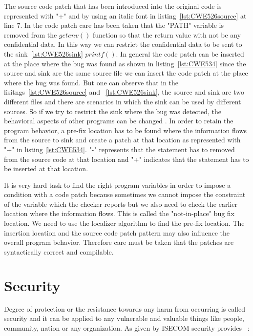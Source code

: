 The source code patch that has been introduced into the original code is represented with "+" and by using an italic font
in listing~\ref{lst:CWE526source} at line 7. In the code patch care has been taken that the "PATH" variable is removed from the $getenv()$
function so that the return value with not be any confidential data. In this way we can restrict the confidential data
to be sent to the sink~\ref{lst:CWE526sink} $printf()$. In general the code patch can be inserted at the place where the bug was found 
as shown in listing~\ref{lst:CWE534} since the source and sink are the same source file we can insert the code patch at the place 
where the bug was found. But one can observe that in the lisitngs~\ref{lst:CWE526source} and ~\ref{lst:CWE526sink}, the source
and sink are two different files and there are scenarios in which the sink can
be used by different sources. So if we 
try to restrict the sink where the bug was detected, 
the behavioral aspects of other programs can be changed 
. In order to retain the program behavior, a pre-fix location has to be 
found where the information flows from the source to sink and create
a patch at that location as represented with "+" in listing \ref{lst:CWE534}. "-" represents that the statement has to removed
from the source code at that location and "+" indicates that the statement has to be inserted at that location.

It is very hard task to find the right program variables in order to impose a condition with a code patch because sometimes
we cannot impose the constraint of the variable which the checker reports but we also need to check the earlier location
where the information flows. This is called the "not-in-place" bug fix location. 
We need to use the localizer algorithm to find
the pre-fix location. The insertion location and the source code patch pattern may also influence the overall program behavior. 
Therefore care must be taken that the patches are syntactically correct and compilable.

\section{Security}


Degree of protection or the resistance towards any harm from occurring is called security and it can be applied to 
any vulnerable and valuable things like people, community, nation or any organization.
As given by ISECOM security provides ~\cite{open:OSSTMM}:\smallskip
 
 
 
